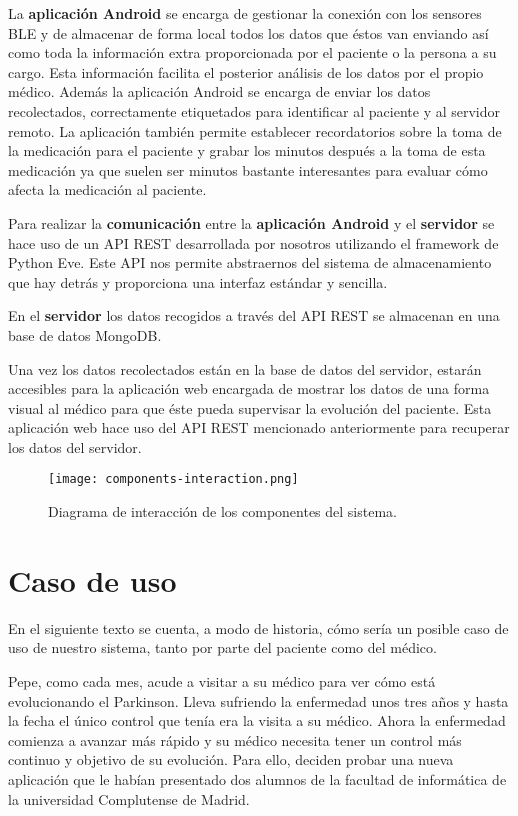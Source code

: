 \documentclass[11pt,spanish]{article}
\begin{document}
La \textbf{aplicación Android} se encarga de gestionar la conexión con los sensores BLE y de almacenar de forma local todos los datos que éstos van enviando así como toda la información extra proporcionada por el paciente o la persona a su cargo. Esta información facilita el posterior análisis de los datos por el propio médico. Además la aplicación Android se encarga de enviar los datos recolectados, correctamente etiquetados para identificar al paciente y al servidor remoto. La aplicación también permite establecer recordatorios sobre la toma de la medicación para el paciente y grabar los minutos después a la toma de esta medicación ya que suelen ser minutos bastante interesantes para evaluar cómo afecta la medicación al paciente.
\newline

Para realizar la \textbf{comunicación} entre la \textbf{aplicación Android} y el \textbf{servidor} se hace uso de un API REST desarrollada por nosotros utilizando el framework de Python Eve. Este API nos permite abstraernos del sistema de almacenamiento que hay detrás y proporciona una interfaz estándar y sencilla.
\newline

En el \textbf{servidor} los datos recogidos a través del API REST se almacenan en una base de datos MongoDB.
\newline

Una vez los datos recolectados están en la base de datos del servidor, estarán accesibles para la aplicación web encargada de mostrar los datos de una forma visual al médico para que éste pueda supervisar la evolución del paciente. Esta aplicación web hace uso del API REST mencionado anteriormente para recuperar los datos del servidor.
\newline

\begin{figure}[H]
  \centering
  \texttt{[image: components-interaction.png]}
  \caption{Diagrama de interacción de los componentes del sistema.}
\end{figure}
\newpage

\section{Caso de uso}
En el siguiente texto se cuenta, a modo de historia, cómo sería un posible caso de uso de nuestro sistema, tanto por parte del paciente como del médico.
\newline

Pepe, como cada mes, acude a visitar a su médico para ver cómo está evolucionando el Parkinson. Lleva sufriendo la enfermedad unos tres años y hasta la fecha el único control que tenía era la visita a su médico. Ahora la enfermedad comienza a avanzar más rápido y su médico necesita tener un control más continuo y objetivo de su evolución. Para ello, deciden probar una nueva aplicación que le habían presentado dos alumnos de la facultad de informática de la universidad Complutense de Madrid.
\newline
\end{document}
